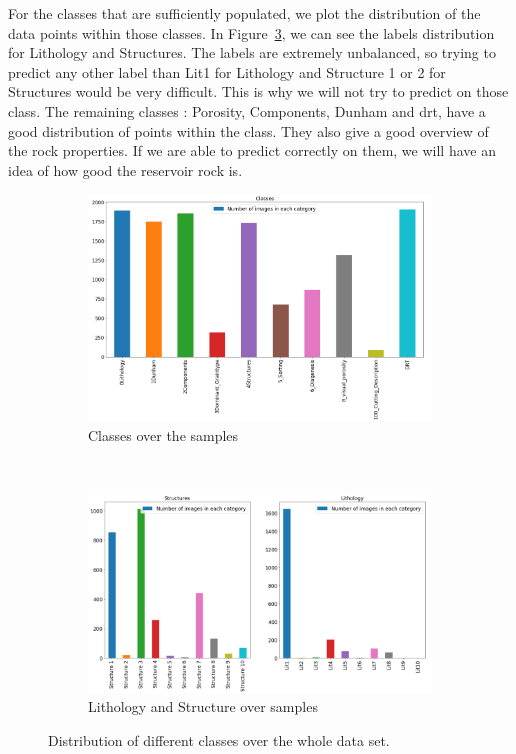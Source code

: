  For the classes that are sufficiently populated, we plot the distribution of the data points within those classes. In Figure~\ref{fig:litandstruct}, we can see the labels distribution for Lithology and Structures. The labels are extremely unbalanced, so trying to predict any other label than Lit1 for Lithology and Structure 1 or 2 for Structures would be very difficult. This is why we will not try to predict on those class. 
 The remaining classes : Porosity, Components, Dunham and \gls{drt}, have a good distribution of points within the class. They also give a good overview of the rock properties. If we are able to predict correctly on them, we will have an idea of how good the reservoir rock is. 


\begin{figure}
\begin{subfigure}{1\textwidth}
  \centering
  \includegraphics[width=.8\linewidth]{figures/03-classes_xl.png}
  \caption{Classes over the samples}
  \label{fig:classes}
\end{subfigure}%
\\
\begin{subfigure}{1\textwidth}
  \centering
  \includegraphics[width=.8\linewidth]{figures/03-Strucutre_Lithology_xl.PNG}
  \caption{Lithology and Structure over samples}
  \label{fig:litandstruct}
\end{subfigure}
\caption[Classes distributions]{Distribution of different classes over the whole data set.}
\end{figure}


